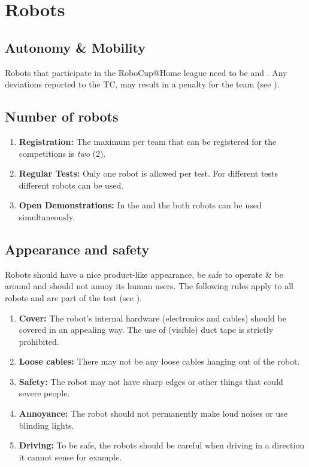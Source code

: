 \section{Robots}
\label{rule:robots}

\subsection{Autonomy \& Mobility}
Robots that participate in the RoboCup@Home league need to be  and . Any deviations reported to the TC, may result in a penalty for the team (see ).

\subsection{Number of robots}
\label{rule:robots_number}

\begin{enumerate}
	\item \textbf{Registration:} The maximum  per team that can be registered for the competitions is \emph{two} (2).
	\item \textbf{Regular Tests:} Only one robot is allowed per test. For different tests different robots can be used.
	\item \textbf{Open Demonstrations:} In the  and the  both robots can be used simultaneously.
\end{enumerate}

\subsection{Appearance and safety}
\label{rule:robot_appearance}

Robots should have a nice product-like appearance, be safe to operate \& be around and should not annoy its human users. The following rules apply to all robots and are part of the  test (see ). 
\begin{enumerate}
	\item \textbf{Cover:} The robot's internal hardware (electronics and cables) should be covered in an appealing way. The use of (visible) duct tape is strictly prohibited.
	\item \textbf{Loose cables:} There may not be any loose cables hanging out of the robot. 
	\item \textbf{Safety:} The robot may not have sharp edges or other things that could severe people.
	\item \textbf{Annoyance:} The robot should not permanently make loud noises or use blinding lights.
	\item \textbf{Driving:} To be safe, the robots should be careful when driving in a direction it cannot sense for example. 
\end{enumerate}








